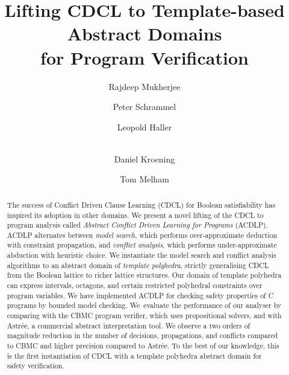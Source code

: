 \documentclass[a4paper]{llncs}
\newcommand{\Omit}[1]{}
\begin{document}
\title{Lifting CDCL to Template-based Abstract Domains\\ for Program Verification}

\author{Rajdeep Mukherjee \and Peter Schrammel \and 
Leopold Haller \and \\ 
Daniel Kroening \and Tom Melham}


\maketitle

\begin{abstract}
%
The success of Conflict Driven Clause Learning (CDCL) for Boolean
satisfiability has inspired its adoption in other domains.  We present a
novel lifting of the CDCL to program analysis called \emph{Abstract Conflict
Driven Learning for Programs} (ACDLP).  ACDLP alternates between \emph{model
search}, which performs over-approximate deduction with constraint
propagation, and \emph{conflict analysis}, which performs under-approximate
abduction with heuristic choice.  We instantiate the model search and
conflict analysis algorithms to an abstract domain of \textit{template
polyhedra}, strictly generalising CDCL from the Boolean lattice to richer
lattice structures.  Our domain of template polyhedra can express intervals,
octagons, and certain restricted polyhedral constraints over program
variables.  We have implemented ACDLP for checking safety properties of C
programs by bounded model checking.  We~evaluate the performance of our
analyser by comparing with the CBMC program verifier, which uses
propositional solvers, and with Astr{\'e}e, a commercial abstract
interpretation tool.  We observe a two orders of magnitude reduction in the
number of decisions, propagations, and conflicts compared to CBMC and higher
precision compared to Astr{\'e}e.  To the best of our knowledge, this is the
first instantiation of CDCL with a template polyhedra abstract domain for
safety verification.

\Omit{
on a set of benchmarks drawn from bit-vector regression in SV-COMP'16, bit-precise 
software models of hardware circuits auto-generated from v2c tool, 
auto-generated controller code from simulink and several hand-crafted 
programs with bounded loops.  
}
%
\end{abstract}
\end{document}
